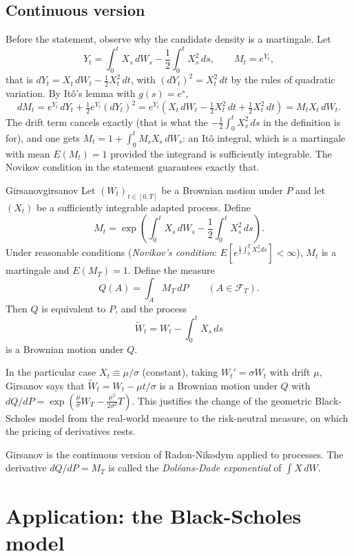 \documentclass[11pt, a4paper]{article}
\begin{document}
\subsection{Continuous version}

Before the statement, observe why the candidate density is a martingale. Let
$$ Y_t = \int_0^t X_s \, dW_s - \frac{1}{2} \int_0^t X_s^2 \, ds, \qquad M_t = e^{Y_t}, $$
that is $dY_t = X_t \, dW_t - \tfrac{1}{2} X_t^2 \, dt$, with $(dY_t)^2 = X_t^2 \, dt$ by the
rules of quadratic variation. By Itô's lemma with $g(s) = e^s$,
$$ dM_t = e^{Y_t} \, dY_t + \tfrac{1}{2} e^{Y_t} (dY_t)^2 = e^{Y_t} \left( X_t \, dW_t -
\tfrac{1}{2} X_t^2 \, dt + \tfrac{1}{2} X_t^2 \, dt \right) = M_t X_t \, dW_t. $$
The drift term cancels exactly (that is what the $-\tfrac{1}{2} \int_0^t X_s^2
\, ds$ in the definition is for), and one gets $M_t = 1 + \int_0^t M_s X_s \, dW_s$: an Itô integral,
which is a martingale with mean $E(M_t) = 1$ provided the integrand is sufficiently
integrable. The Novikov condition in the statement guarantees exactly that.

\begin{teorema}{Girsanov}{girsanov}
Let $(W_t)_{t \in [0, T]}$ be a Brownian motion under $P$ and let $(X_t)$ be a sufficiently integrable
adapted process. Define
$$ M_t = \exp\!\left( \int_0^t X_s \, dW_s - \frac{1}{2} \int_0^t X_s^2 \, ds \right). $$
Under reasonable conditions (\emph{Novikov's condition}: $E[e^{\tfrac{1}{2} \int_0^T X_s^2 ds}]
< \infty$), $M_t$ is a martingale and $E(M_T) = 1$. Define the measure
$$ Q(A) = \int_A M_T \, dP \qquad (A \in \mathcal{F}_T). $$
Then $Q$ is equivalent to $P$, and the process
$$ \widetilde{W}_t = W_t - \int_0^t X_s \, ds $$
is a Brownian motion under $Q$.
\end{teorema}

\obs In the particular case $X_t \equiv \mu/\sigma$ (constant), taking $W_t' = \sigma W_t$ with
drift $\mu$, Girsanov says that $\widetilde{W}_t = W_t - \mu t/\sigma$ is a Brownian motion under
$Q$ with $dQ/dP = \exp(\tfrac{\mu}{\sigma} W_T - \tfrac{\mu^2}{2\sigma^2} T)$. This justifies the
change of the geometric Black-Scholes model from the real-world measure to the risk-neutral
measure, on which the pricing of derivatives rests.

\obs Girsanov is the continuous version of Radon-Nikodym applied to processes. The derivative
$dQ/dP = M_T$ is called the \emph{Doléans-Dade exponential} of $\int X \, dW$.

\newpage

\section{Application: the Black-Scholes model}
\end{document}
